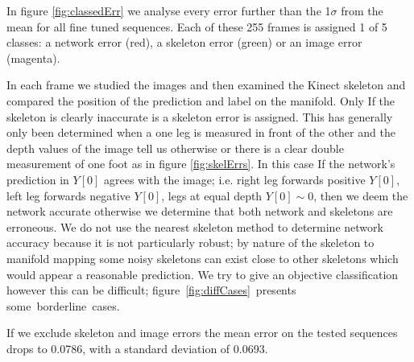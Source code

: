 \documentclass[11pt]{article} %
\begin{document}
In figure \ref{fig:classedErr} we analyse every error further than the 1$\sigma$ from the mean for all fine tuned sequences. Each of these 255 frames is assigned 1 of 5 classes: a network error (red), a skeleton error (green) or an image error (magenta).

In each frame we studied the images and then examined the Kinect skeleton and compared the position of the prediction and label on the manifold. Only If the skeleton is clearly inaccurate is a skeleton error is assigned. This has generally only been determined when a one leg is measured in front of the other and the depth values of the image tell us otherwise or there is a clear double measurement of one foot as in figure \ref{fig:skelErrs}. In this case If the network's prediction in $Y[0]$ agrees with the image; i.e. right leg forwards positive $Y[0]$,  left leg forwards negative $Y[0]$, legs at equal depth $Y[0]\sim 0$, then we deem the network accurate otherwise we determine that both network and skeletons are erroneous. We do not use the nearest skeleton method to determine network accuracy because it is not particularly robust; by nature of the skeleton to manifold mapping some noisy skeletons can exist close to other skeletons which would appear a reasonable prediction. We try to give an objective classification however this can be difficult; figure~\ref{fig:diffCases}~presents some~borderline~cases. 

If we exclude skeleton and image errors the mean error on the tested sequences drops to 0.0786, with a standard deviation of 0.0693.
\end{document}
